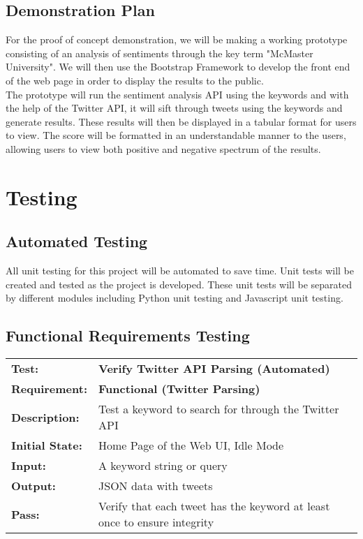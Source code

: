 \documentclass{article}
\begin{document}
\subsection{Demonstration Plan}
For the proof of concept demonstration, we will be making a working prototype consisting of an analysis of sentiments through the key term "McMaster University". We will then use the Bootstrap Framework to develop the front end of the web page in order to display the results to the public.\\
The prototype will run the sentiment analysis API using the keywords and with the help of the Twitter API, it will sift through tweets using the keywords and generate results. These results will then be displayed in a tabular format for users to view. The score will be formatted in an understandable manner to the users, allowing users to view both positive and negative spectrum of the results.
	




\newpage 

\section{Testing}


	\subsection{Automated Testing}
	All unit testing for this project will be automated to save time. Unit tests will be created and tested as the project is developed. These unit tests will be separated by different modules including Python unit testing and Javascript unit testing.

	\newpage

	\subsection{Functional Requirements Testing}

	\begin{mdframed}[linewidth=1pt] %
	\begin{tabularx}{\textwidth}{@{}p{3cm}X@{}}
	{\bf Test:} & {\bf Verify Twitter API Parsing (Automated)}\\[\baselineskip]
	{\bf Requirement:} & {\bf Functional (Twitter Parsing)}\\[\baselineskip]
	{\bf Description:} & Test a keyword to search for through the Twitter API \\[0.5\baselineskip]
	{\bf Initial State:} & Home Page of the Web UI, Idle Mode\\[0.5\baselineskip]
	{\bf Input:} &  A keyword string or query\\[0.5\baselineskip]
	{\bf Output:} & JSON data with tweets\\[0.5\baselineskip]
	{\bf Pass:} & Verify that each tweet has the keyword at least once to ensure integrity
	\end{tabularx}
	\end{mdframed}
\end{document}
